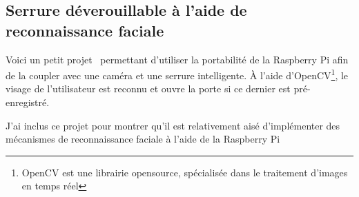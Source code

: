 \subsection{Serrure déverouillable à l'aide de reconnaissance faciale}
Voici un petit projet~\cite{DOORLOCK} permettant d'utiliser la portabilité de la Raspberry Pi afin de la coupler avec une caméra et une serrure intelligente. 
À l'aide d'OpenCV\footnote{OpenCV est une librairie opensource, spécialisée dans le traitement d'images en temps réel\cite{wiki:opencv}}, le visage de l'utilisateur est reconnu et ouvre la porte si ce dernier est pré-enregistré. 

J'ai inclus ce projet pour montrer qu'il est relativement aisé d'implémenter des mécanismes de reconnaissance faciale à l'aide de la Raspberry Pi
